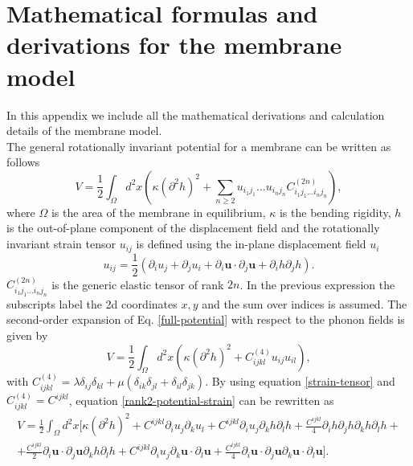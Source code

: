 
\chapter{Mathematical formulas and derivations for the membrane model} %

\label{appendixA} %

In this appendix we include all the mathematical derivations and calculation details of the membrane model. \\

The general rotationally invariant potential for a membrane can be written as follows
\begin{equation}
 \label{full-potential}
 V=\frac{1}{2}\int_{\Omega}{d^{2}x\left(\kappa(\partial^{2}h)^{2}+\sum_{n\geq 2}u_{i_{1}j_{1}}\dots u_{i_{n}j_{n}}C_{i_{1}j_{1}\dots i_{n}j_{n}}^{(2n)}\right)},
\end{equation}
where $\Omega$ is the area of the membrane in equilibrium, $\kappa$ is the bending rigidity, $h$ is the
out-of-plane component of the displacement field and the rotationally invariant strain tensor $u_{ij}$ is defined
using the in-plane displacement field $u_{i}$
\begin{equation}
 \label{strain-tensor}
 u_{ij}=\frac{1}{2}(\partial_{i}u_{j}+\partial_{j}u_{i}+\partial_{i}\boldsymbol{u}\cdot\partial_{j}\boldsymbol{u}+\partial_{i}h\partial_{j}h).
\end{equation}
$C^{(2n)}_{i_{1}j_{1}\dots i_{n}j_{n}}$ is the generic elastic tensor of rank $2n$. In the previous expression the
subscripts label the 2d coordinates $x,y$ and the sum over indices is assumed. The second-order expansion of
Eq. \ref{full-potential} with respect to the phonon fields is given by
\begin{equation}
 \label{rank2-potential-strain}
 V=\frac{1}{2}\int_{\Omega}{d^{2}x\left(\kappa(\partial^{2}h)^{2}+C^{(4)}_{ijkl}u_{ij}u_{il}\right)},
\end{equation}
with $C^{(4)}_{ijkl}=\lambda\delta_{ij}\delta_{kl}+\mu(\delta_{ik}\delta_{jl}+\delta_{il}\delta_{jk})$. By using
equation \ref{strain-tensor} and $C_{ijkl}^{(4)}=C^{ijkl}$, equation \ref{rank2-potential-strain} can be rewritten as
\begin{multline}
 \label{rank2-potential-disp}
 V=\frac{1}{2}\int_{\Omega}d^{2}x[\kappa(\partial^{2}h)^{2}+C^{ijkl}\partial_{i}u_{j}\partial_{k}u_{l}+C^{ijkl}\partial_{i}u_{j}\partial_{k}h\partial_{l}h+\frac{C^{ijkl}}{4}\partial_{i}h\partial_{j}h\partial_{
 k}h\partial_{l}h+\\+\frac{C^{ijkl}}{2}\partial_{i}\boldsymbol{u}\cdot\partial_{j}\boldsymbol{u}\partial_{k}h\partial_{l}h+C^{ijkl}\partial_{i}u_{j}\partial_{k}\boldsymbol{u}\cdot\partial_{l}\boldsymbol{u}+
\frac{C^{ijkl}}{4}\partial_{i}\boldsymbol{u}\cdot\partial_{j}\boldsymbol{u}\partial_{k}\boldsymbol{u}\cdot\partial_{l}\boldsymbol{u}].
\end{multline}
